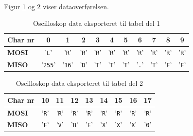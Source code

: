 Figur \ref{table:scop_getlog1} og \ref{table:scop_getlog2} viser dataoverførelsen. 

\begin{table}[h]
	\caption{Oscilloskop data eksporteret til tabel del 1}
	\centering
	\begin{tabular}{|l|c|c|c|c|c|c|c|c|c|c|}
		\hline 
		\textbf{Char nr} & \textbf{0} & \textbf{1} & \textbf{2} & \textbf{3} & \textbf{4} & \textbf{5} 
						 & \textbf{6} & \textbf{7} & \textbf{8} & \textbf{9}\\ 		
		\hline 
		\textbf{MOSI} & '\verb+L+' & '\verb+R+' & '\verb+R+' & '\verb+R+' & '\verb+R+' & '\verb+R+' 
						& '\verb+R+' & '\verb+R+' & '\verb+R+' & '\verb+R+'\\ 
		\hline 
		\textbf{MISO} & '\verb+255+' & '\verb+16+' & '\verb+D+' & '\verb+T+' & '\verb+T+' & '\verb+T+' 
						& '\verb+.+' & '\verb+T+' & '\verb+F+' & '\verb+F+'\\
						 
		\hline 
	\end{tabular} 
	\label{table:scop_getlog1}
\end{table}


\begin{table}[h]
	\caption{Oscilloskop data eksporteret til tabel del 2}
	\centering
	\begin{tabular}{|l|c|c|c|c|c|c|c|c|}
		\hline 
		\textbf{Char nr} & \textbf{10} & \textbf{11} & \textbf{12} & \textbf{13}
						& \textbf{14} & \textbf{15} & \textbf{16} & \textbf{17}\\ 		
		\hline 
		\textbf{MOSI} 	& '\verb+R+' & '\verb+R+' & '\verb+R+' & '\verb+R+'
						& '\verb+R+' & '\verb+R+' & '\verb+R+' & '\verb+R+' \\ 
		\hline 
		\textbf{MISO}	& '\verb+F+' & '\verb+V+' & '\verb+B+' & '\verb+E+'
						& '\verb+X+' & '\verb+X+' & '\verb+X+' & '\verb+0+'\\
						 
		\hline 
	\end{tabular} 
	\label{table:scop_getlog2}
\end{table}

